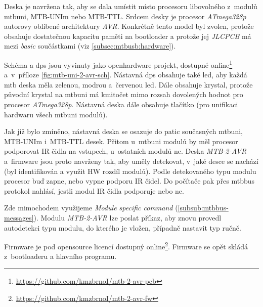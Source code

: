 Deska je navržena tak, aby se dala umístit místo procesoru libovolného z~modulů
\gls{mtbuni}, MTB-UNIm nebo MTB-TTL. Srdcem desky je procesor
\textit{ATmega328p} autorovy oblíbené architektury \textit{AVR}.
Konkrétně tento model byl zvolen, protože obsahuje dostatečnou kapacitu paměti
na bootloader a protože jej \textit{JLCPCB} má mezi \textit{basic} součástkami
(viz \ref{subsec:mtbusb:hardware}).

Schéma a \gls{dps} jsou vyvinuty jako openhardware projekt, dostupné
online\footnote{\url{https://github.com/kmzbrnoI/mtb-2-avr-pcb}} a~v~příloze
\ref{fig:mtb-uni-2-avr-sch}. Nástavná \gls{dps} obsahuje také \gls{led}, aby každá
\gls{mtb} deska měla zelenou, modrou a~červenou \gls{led}. Dále obsahuje krystal,
protože původní krystal na \gls{mtbuni} má kmitočet mimo rozsah dovolených
hodnot pro procesor \textit{ATmega328p}. Nástavná deska dále
obsahuje tlačítko (pro unifikaci hardwaru všech \gls{mtbuni} modulů).

Jak již bylo zmíněno, nástavná deska se osazuje do patic současných
\gls{mtbuni}, MTB-UNIm i~MTB-TTL desek. Přitom u~\gls{mtbuni} modulů by měl
procesor podporovat IR čidla na vstupech, u~ostatních modulů ne. Deska \textit{MTB-2-AVR}
a~firmware jsou proto navrženy tak, aby uměly detekovat, v~jaké desce se
nachází (byl identifikován a využit HW rozdíl modulů). Podle detekovaného typu
modulu procesor buď zapne, nebo vypne podporu IR čidel. Do počítače pak přes
\gls{mtbbus} protokol nahlásí, jestli modul IR čidla podporuje nebo ne.

Zde mimochodem využijeme \textit{Module specific command}
(\ref{subsub:mtbbus-messages}). Modulu \textit{MTB-2-AVR} lze poslat příkaz,
aby znovu provedl autodetekci typu modulu, do kterého je vložen, případně
nastavit typ ručně.

Firmware je pod opensource licencí dostupný
online\footnote{\url{https://github.com/kmzbrnoI/mtb-2-avr-fw}}.
Firmware se opět skládá z~bootloaderu a hlavního programu.

